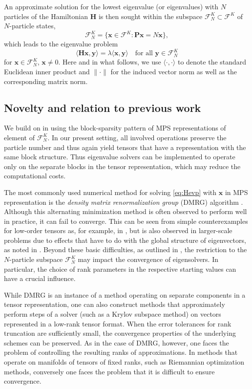 \documentclass[a4paper,11pt,oneside]{amsart}
\providecommand{\norm}[1]{\lVert#1\rVert}
\theoremstyle{definition}
\theoremstyle{remark}
\newcommand{\ten}[1]{\boldsymbol{#1}}
\numberwithin{equation}{section}
\numberwithin{theorem}{section}
\begin{document}
An approximate solution for the lowest eigenvalue (or eigenvalues)  with $N$ particles of the Hamiltonian $\ten H$ is then sought within the subspace $\mathcal{F}_N^K \subset \mathcal{F}^K$ of $N$-particle states,
\[
 \mathcal{F}_N^K = \bigl\{ \ten{x} \in \mathcal{F}^K\colon   \ten P\ten x = N \ten x \bigr\} ,
\]
which leads to the eigenvalue problem
\begin{equation}\label{eq:Hevp}
 \langle \ten H \ten x, \ten y \rangle = \lambda \langle \ten x, \ten y \rangle \quad\text{for all $\ten y \in \mathcal{F}_N^K$}
\end{equation}
for $\ten x \in \mathcal{F}_N^K$, $\ten x \neq 0$. Here and in what follows, we use $\langle \cdot , \cdot \rangle$ to denote the standard Euclidean inner product and $\norm{\cdot}$ for the induced vector norm as well as the corresponding matrix norm.

\subsection{Novelty and relation to previous work}

We build on \cite{BGP:22} in using the block-sparsity pattern of MPS representations of element of $\mathcal{F}_N^K$. In our present setting, all involved operations preserve the particle number and thus again yield tensors that have a representation with the same block structure. Thus eigenvalue solvers can be implemented to operate only on the separate blocks in the tensor representation, which may reduce the computational costs. 

The most commonly used numerical method for solving \eqref{eq:Hevp} with $\ten x$ in MPS representation is the \emph{density matrix renormalization group} (DMRG) algorithm \cite{white,vidal03}. Although this alternating minimization method is often observed to perform well in practice, it can fail to converge. This can be seen from simple counterexamples for low-order tensors as, for example, in \cite[Ex.~5.12]{Pfeffer:18}, but is also observed in larger-scale problems due to effects that have to do with the global structure of eigenvectors, as noted in \cite{Dolfietal:12}. Beyond these basic difficulties, as outlined in \cite{BGP:22}, the restriction to the $N$-particle subspace $\mathcal{F}_N^K$ may impact the convergence of eigensolvers. In particular, the choice of rank parameters in the respective starting values can have a crucial influence.

While DMRG is an instance of a method operating on separate components in a tensor representation, one can also construct methods that approximately perform steps of a solver (such as a Krylov subspace method) on vectors represented in a low-rank tensor format. When the error tolerances for rank truncation are sufficiently small, the convergence properties of the underlying schemes can be preserved. As in the case of DMRG, however, one faces the problem of controlling the resulting ranks of approximations. 
In methods that operate on manifolds of tensors of fixed ranks, such as Riemannian optimization methods, conversely one faces the problem that it is difficult to ensure convergence.
\end{document}
